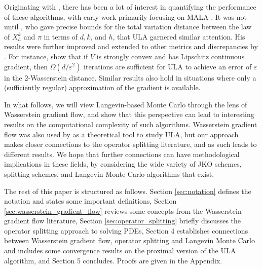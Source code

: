 \documentclass[final,12pt]{colt2018}
\begin{document}
Originating with \citet{roberts1996exponential}, there has been a lot of interest in quantifying the performance of these algorithms, with early work primarily focusing on MALA \citep[see e.g.][]{jarner2000geometric,roberts2002langevin,pillai2012optimal,xifara2014langevin}. It was not until \citet{dalalyan2014theoretical}, who gave precise bounds for the total variation distance between the law of $X_h^{k}$ and $\pi$ in terms of $d, k$, and $h$, that ULA garnered similar attention. His results were further improved and extended to other metrics and discrepancies by \citet{durmus2016sampling,durmus2017nonasymptotic, cheng2017convergence, dalalyan2017further}. For instance, \citet{dalalyan2017user} show that if $V$ is strongly convex and has Lipschitz continuous gradient, then  $\Omega(d/\varepsilon^2)$ iterations are sufficient for ULA to achieve an error of $\varepsilon$ in the $2$-Wasserstein distance. Similar results also hold in situations where only a (sufficiently regular) approximation of the gradient is available.

In what follows, we will view Langevin-based Monte Carlo through the lens of Wasserstein gradient flow, and show that this perspective can lead to interesting results on the computational complexity of such algorithms. Wasserstein gradient flow was also used by \citet{cheng2017convergence} as a theoretical tool to study ULA, but our approach makes closer connections to the operator splitting literature, and as such leads to different results. We hope that further connections can have methodological implications in these fields, by considering the wide variety of JKO schemes, splitting schemes, and Langevin Monte Carlo algorithms that exist. 

The rest of this paper is structured as follows. Section \ref{sec:notation} defines the notation and states some important definitions, Section \ref{sec:wasserstein_gradient_flow} reviews some concepts from the Wasserstein gradient flow literature, Section \ref{sec:operator_splitting} briefly discusses the operator splitting approach to solving PDEs, Section 4 establishes connections between Wasserstein gradient flow, operator splitting and Langevin Monte Carlo and includes some convergence results on the proximal version of the ULA algorithm, and Section 5 concludes. Proofs are given in the Appendix.
\end{document}
